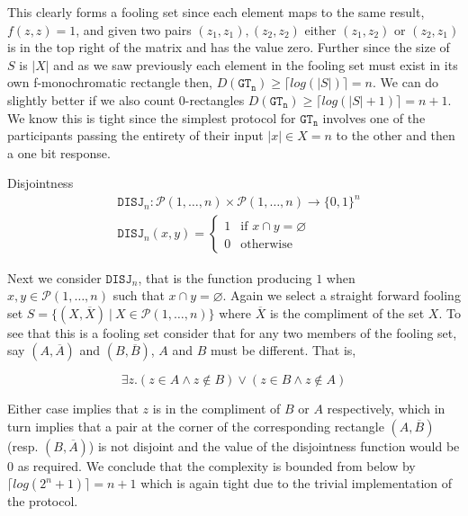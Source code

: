 \documentclass[usletter]{article}
\begin{document}
\vspace{0.3cm}

This clearly forms a fooling set since each element maps to the same result, $f(z,z) = 1$, and given two pairs $(z_1, z_1), (z_2, z_2)$ either $(z_1, z_2)$ or $(z_2, z_1)$ is in the top right of the matrix and has the value zero. Further since the size of $S$ is $|X|$ and as we saw previously each element in the fooling set must exist in its own f-monochromatic rectangle then, $D(\mathtt{GT_n}) \geq \lceil{log(|S|)}\rceil = n$. We can do slightly better if we also count 0-rectangles $D(\mathtt{GT_n}) \geq \lceil{log(|S| + 1)}\rceil = n + 1$. We know this is tight since the simplest protocol for $\mathtt{GT_n}$ involves one of the participants passing the entirety of their input $|x| \in X = n$ to the other and then a one bit response.

\begin{example}
  Disjointness
  \begin{align*}
    & \mathtt{DISJ}_n : \mathcal{P}({1,\ldots,n}) \times \mathcal{P}({1,\ldots,n}) \rightarrow \{0,1\}^n \\
    & \mathtt{DISJ}_n(x,y) = \left \{
      \begin{array}{ll}
        1  & \mbox{if } x \cap y = \varnothing \\
        0 & \mbox{otherwise}
        \end{array}
      \right.
  \end{align*}
\end{example}

Next we consider $\mathtt{DISJ}_n$, that is the function producing $1$ when $x,y \in \mathcal{P}({1,\ldots,n})$ such that $x \cap y = \varnothing$. Again we select a straight forward fooling set $S = \{(X, \overline{X})\ |\ X \in \mathcal{P}({1,\ldots,n})\}$ where $\overline{X}$ is the compliment of the set $X$. To see that this is a fooling set consider that for any two members of the fooling set, say $(A, \overline{A})$ and $(B, \overline{B})$, $A$ and $B$ must be different. That is,

\begin{equation*}
  \exists z.(z \in A \land z \notin B) \lor (z \in B \land z \notin A)
\end{equation*}

Either case implies that $z$ is in the compliment of $B$ or $A$ respectively, which in turn implies that a pair at the corner of the corresponding rectangle $(A, \overline{B})$ (resp. $(B, \overline{A})$) is not disjoint and the value of the disjointness function would be 0 as required. We conclude that the complexity is bounded from below by $\lceil{log(2^n + 1)}\rceil = n + 1$ which is again tight due to the trivial implementation of the protocol.
\end{document}
